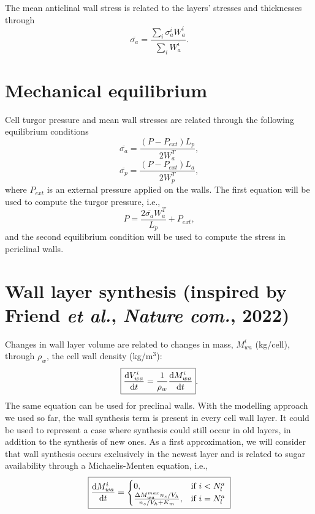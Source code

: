 \documentclass[]{article}
\begin{document}
The mean anticlinal wall stress is related to the layers' stresses and thicknesses through
\begin{equation}
	\overline{\sigma_a}=\frac{\sum_i \sigma_a^i W_a^i}{\sum_i W_a^i}.
\end{equation}
\section{Mechanical equilibrium}
Cell turgor pressure and mean wall stresses are related through the following equilibrium conditions
\begin{equation}
	\overline{\sigma_a}=\frac{(P-P_{ext})L_p}{2W_a^T},
\end{equation}
\begin{equation}
	\overline{\sigma_p}=\frac{(P-P_{ext})L_a}{2W_p^T},
\end{equation}
where $P_{ext}$ is an external pressure applied on the walls. The first equation will be used to compute the turgor pressure, i.e.,
\begin{equation}
	P=\frac{2\overline{\sigma_a}W_a^T}{L_p} + P_{ext},
\end{equation}
and the second equilibrium condition will be used to compute the stress in periclinal walls.\\

\section{Wall layer synthesis (inspired by Friend \textit{et al.}, \textit{Nature com.}, 2022)}
Changes in wall layer volume are related to changes in mass, $M_{wa}^i$ (kg/cell), through $\rho_w$, the cell wall density (kg/m$^3$):
\begin{equation}
	\boxed{
		\frac{{\rm d} V_{wa}^i}{{\rm d} t}=\frac{1}{\rho_w}\frac{{\rm d} M_{wa}^i}{{\rm d} t}}.
\end{equation}
The same equation can be used for preclinal walls. With the modelling approach we used so far, the wall synthesis term is present in every cell wall layer. It could be used to represent a case where synthesis could still occur in old layers, in addition to the synthesis of new ones. As a first approximation, we will consider that wall synthesis occurs exclusively in the newest layer and is related to sugar availability through a Michaelis-Menten equation, i.e.,
\begin{equation}
	\boxed{
	\frac{{\rm d} M_{wa}^i}{{\rm d} t} = \begin{cases}
		0, & \text{if } i < N_l^a \\
		\frac{\Delta{M_{wa}^{max}}n_s/V_h}{n_s/V_h + K_m}, & \text{if } i = N_l^a
	\end{cases} \\}
\end{equation}
\end{document}
